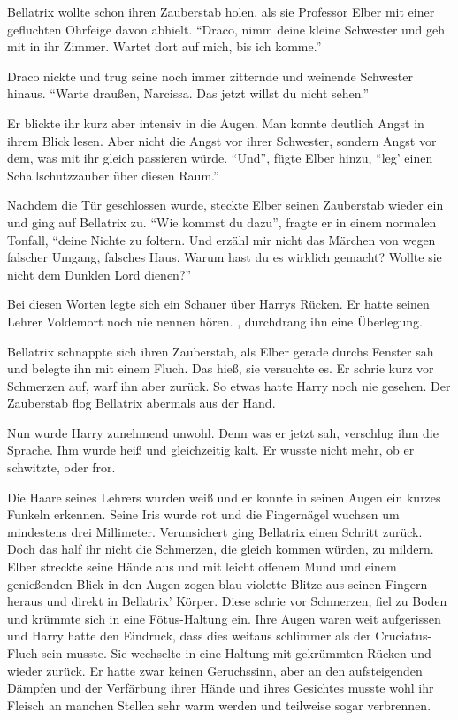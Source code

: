 Bellatrix wollte schon ihren Zauberstab holen, als sie Professor Elber mit einer gefluchten Ohrfeige davon abhielt. \enquote{Draco, nimm deine kleine Schwester und geh mit in ihr Zimmer. Wartet dort auf mich, bis ich komme.}

Draco nickte und trug seine noch immer zitternde und weinende Schwester hinaus. \enquote{Warte draußen, Narcissa. Das jetzt willst du nicht sehen.}

Er blickte ihr kurz aber intensiv in die Augen. Man konnte deutlich Angst in ihrem Blick lesen. Aber nicht die Angst vor ihrer Schwester, sondern Angst vor dem, was mit ihr gleich passieren würde. \enquote{Und}, fügte Elber hinzu, \enquote{leg' einen Schallschutzzauber über diesen Raum.}

Nachdem die Tür geschlossen wurde, steckte Elber seinen Zauberstab wieder ein und ging auf Bellatrix zu. \enquote{Wie kommst du dazu}, fragte er in einem normalen Tonfall, \enquote{deine Nichte zu foltern. Und erzähl mir nicht das Märchen von wegen falscher Umgang, falsches Haus. Warum hast du es wirklich gemacht? Wollte sie nicht dem Dunklen Lord dienen?}

Bei diesen Worten legte sich ein Schauer über Harrys Rücken. Er hatte seinen Lehrer Voldemort noch nie  nennen hören. , durchdrang ihn eine Überlegung.

Bellatrix schnappte sich ihren Zauberstab, als Elber gerade durchs Fenster sah und belegte ihn mit einem Fluch. Das hieß, sie versuchte es. Er schrie kurz vor Schmerzen auf, warf ihn aber zurück. So etwas hatte Harry noch nie gesehen. Der Zauberstab flog Bellatrix abermals aus der Hand.

Nun wurde Harry zunehmend unwohl. Denn was er jetzt sah, verschlug ihm die Sprache. Ihm wurde heiß und gleichzeitig kalt. Er wusste nicht mehr, ob er schwitzte, oder fror.

Die Haare seines Lehrers wurden weiß und er konnte in seinen Augen ein kurzes Funkeln erkennen. Seine Iris wurde rot und die Fingernägel wuchsen um mindestens drei Millimeter. Verunsichert ging Bellatrix einen Schritt zurück. Doch das half ihr nicht die Schmerzen, die gleich kommen würden, zu mildern. Elber streckte seine Hände aus und mit leicht offenem Mund und einem genießenden Blick in den Augen zogen blau-violette Blitze aus seinen Fingern heraus und direkt in Bellatrix' Körper. Diese schrie vor Schmerzen, fiel zu Boden und krümmte sich in eine Fötus-Haltung ein. Ihre Augen waren weit aufgerissen und Harry hatte den Eindruck, dass dies weitaus schlimmer als der Cruciatus-Fluch sein musste. Sie wechselte in eine Haltung mit gekrümmten Rücken und wieder zurück. Er hatte zwar keinen Geruchssinn, aber an den aufsteigenden Dämpfen und der Verfärbung ihrer Hände und ihres Gesichtes musste wohl ihr Fleisch an manchen Stellen sehr warm werden und teilweise sogar verbrennen.

